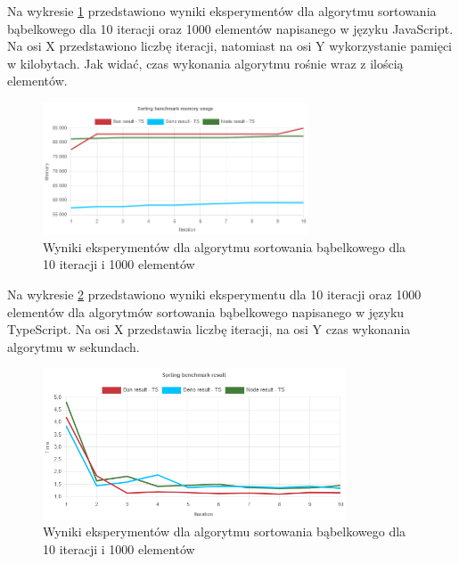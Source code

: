 Na wykresie \ref{fig:bubble_sorting_e1_memory} przedstawiono wyniki eksperymentów dla algorytmu sortowania bąbelkowego dla 10 iteracji oraz 1000 elementów napisanego w języku JavaScript. Na osi X przedstawiono liczbę iteracji, natomiast na osi Y wykorzystanie pamięci w kilobytach. Jak widać, czas wykonania algorytmu rośnie wraz z ilością elementów.
\begin{figure}[H]
  \centering
  \includegraphics[width=0.7\textwidth]{Figures/sorting/bubble/e1_memory_ts.png}
  \caption{Wyniki eksperymentów dla algorytmu sortowania bąbelkowego dla 10 iteracji i 1000 elementów}
  \label{fig:bubble_sorting_e1_memory}
\end{figure}

Na wykresie \ref{fig:bubble_sorting_e1_ts} przedstawiono wyniki eksperymentu dla 10 iteracji oraz 1000 elementów dla algorytmów sortowania bąbelkowego napisanego w języku TypeScript. Na osi X przedstawia liczbę iteracji, na osi Y czas wykonania algorytmu w sekundach.

\begin{figure}[H]
  \centering
  \includegraphics[width=0.8\textwidth]{Figures/sorting/bubble/e1_ts.png}
  \caption{Wyniki eksperymentów dla algorytmu sortowania bąbelkowego dla 10 iteracji i 1000 elementów}
  \label{fig:bubble_sorting_e1_ts}
\end{figure}


